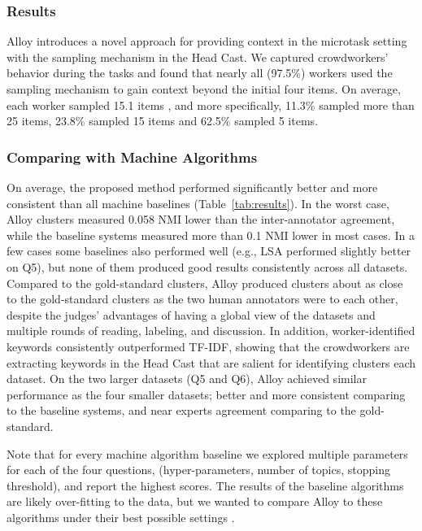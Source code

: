 \subsubsection*{Results}

Alloy introduces a novel approach for providing context in the microtask setting with the sampling mechanism in the Head Cast. We captured  crowdworkers' behavior during the tasks and found that  
nearly all (97.5\%) workers
used the sampling mechanism to gain context beyond the initial four items. On average, each worker sampled 15.1 items
, and more specifically, 11.3\% sampled more than 25 items, 23.8\%
sampled 15 items and 62.5\% sampled 5 items.

\subsubsection*{Comparing with Machine Algorithms}

On average, the proposed method performed significantly better and more consistent
than all machine baselines (Table~\ref{tab:results}). In the worst case, Alloy
clusters measured 0.058 NMI lower than the inter-annotator agreement, while
the baseline systems measured more than 0.1 NMI lower in most cases.  In a few
cases some baselines also performed well (e.g., LSA performed slightly better on Q5),
but none of them
produced good results consistently across all datasets.  Compared to the
gold-standard clusters, Alloy produced clusters about as close to the
gold-standard clusters as the two human annotators were to each other, despite
the judges' advantages of having a global view of the datasets and multiple
rounds of reading, labeling, and discussion. 
In addition, worker-identified keywords consistently outperformed TF-IDF,
showing that the crowdworkers are extracting keywords in the Head Cast that are
salient for identifying clusters each dataset.
On the two larger datasets (Q5 and Q6), Alloy achieved similar
performance as the four smaller datasets; better
and more consistent comparing to the baseline systems, and near experts
agreement comparing to the gold-standard.

Note that for every machine algorithm baseline we explored multiple parameters
for each of the four questions, (hyper-parameters, number of topics,
stopping threshold), and report the highest scores.  The results of the
baseline algorithms are likely over-fitting to the data, but we wanted to
compare Alloy to these algorithms under their best possible settings \cite{chuang2012termite}.

